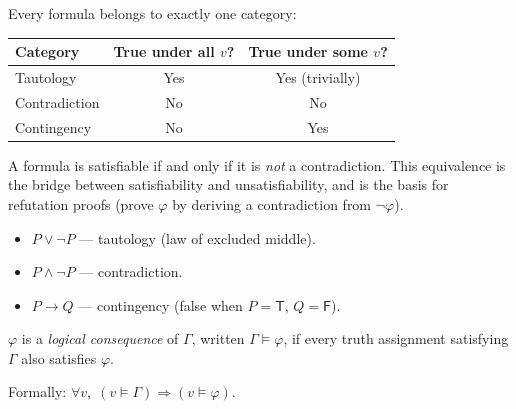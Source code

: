\begin{remark}
Every formula belongs to exactly one category:
\begin{center}
\renewcommand{\arraystretch}{1.2}
\begin{tabular}{lcc}
\toprule
\textbf{Category} & \textbf{True under all $v$?} & \textbf{True under some $v$?} \\
\midrule
Tautology     & Yes & Yes (trivially) \\
Contradiction & No  & No \\
Contingency   & No  & Yes \\
\bottomrule
\end{tabular}
\end{center}
\end{remark}

\begin{remark}
A formula is satisfiable if and only if it is \emph{not} a contradiction.
This equivalence is the bridge between satisfiability and unsatisfiability,
and is the basis for refutation proofs (prove $\varphi$ by deriving a
contradiction from $\neg\varphi$).
\end{remark}

\begin{example}
\begin{itemize}
  \item $P \vee \neg P$ — tautology (law of excluded middle).
  \item $P \wedge \neg P$ — contradiction.
  \item $P \rightarrow Q$ — contingency (false when $P = \mathsf{T}$, $Q = \mathsf{F}$).
\end{itemize}
\end{example}

\begin{tcolorbox}[colback=propbox, colframe=propborder, arc=2pt,
  left=6pt, right=6pt, top=4pt, bottom=4pt,
  title={\small\textbf{Definition (Logical Consequence)}},
  fonttitle=\small\bfseries]
\label{def:consequence}
$\varphi$ is a \emph{logical consequence} of $\Gamma$, written $\Gamma \models \varphi$,
if every truth assignment satisfying $\Gamma$ also satisfies $\varphi$.

Formally: $\forall v,\; (v \models \Gamma) \Rightarrow (v \models \varphi)$.
\end{tcolorbox}

